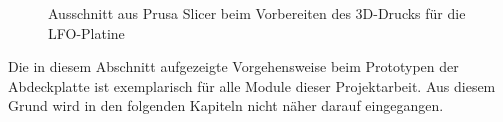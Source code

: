 \begin{figure}[h]
	\centering
	\setlength{\fboxsep}{1pt} %
	\setlength{\fboxrule}{1pt} %
	\caption{Ausschnitt aus \grqq{}Prusa Slicer\grqq{} beim Vorbereiten des 3D-Drucks für die LFO-Platine \cite{prusa}}
	\label{fig:3DDruck_LFO}
\end{figure}
\FloatBarrier

Die in diesem Abschnitt aufgezeigte Vorgehensweise beim Prototypen der Abdeckplatte ist exemplarisch für alle Module dieser Projektarbeit. Aus diesem Grund wird in den folgenden Kapiteln nicht näher darauf eingegangen.